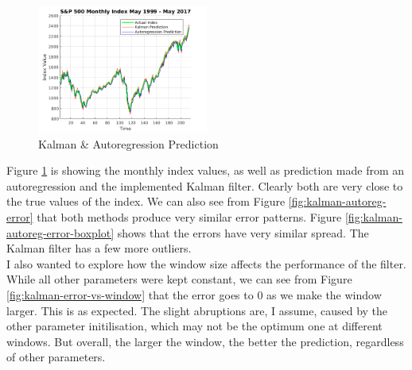 \documentclass[11pt, fleqn]{article}
\begin{document}
\begin{figure}
	\vspace{-1cm}
  	\centering
  	\includegraphics[width=0.5\textwidth]{kalman-autoreg-pred.png}
	\caption{Kalman \& Autoregression Prediction}
	\label{fig:kalman-autoreg-pred}
\end{figure}

Figure \ref{fig:kalman-autoreg-pred} is showing the monthly index values, as well as prediction made from an autoregression and the implemented Kalman filter. Clearly both are very close to the true values of the index. We can also see from Figure \ref{fig:kalman-autoreg-error} that both methods produce very similar error patterns. Figure \ref{fig:kalman-autoreg-error-boxplot} shows that the errors have very similar spread. The Kalman filter has a few more outliers.\\

I also wanted to explore how the window size affects the performance of the filter. While all other parameters were kept constant, we can see from Figure \ref{fig:kalman-error-vs-window} that the error goes to 0 as we make the window larger. This is as expected. The slight abruptions are, I assume, caused by the other parameter initilisation, which may not be the optimum one at different windows. But overall, the larger the window, the better the prediction, regardless of other parameters.
\end{document}
